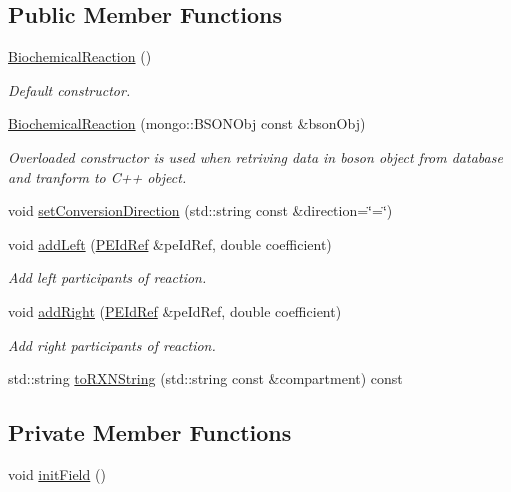 \subsection*{Public Member Functions}
\begin{DoxyCompactItemize}
\item 
\hyperlink{classunisys_1_1BiochemicalReaction_a1058034c07346ef992ba78c3260b1ac6}{Biochemical\-Reaction} ()
\begin{DoxyCompactList}\small\item\em Default constructor. \end{DoxyCompactList}\item 
\hyperlink{classunisys_1_1BiochemicalReaction_a50d32f8995cb279b41c37a731f48bfe1}{Biochemical\-Reaction} (mongo\-::\-B\-S\-O\-N\-Obj const \&bson\-Obj)
\begin{DoxyCompactList}\small\item\em Overloaded constructor is used when retriving data in boson object from database and tranform to C++ object. \end{DoxyCompactList}\item 
void \hyperlink{classunisys_1_1BiochemicalReaction_a33073d1e349bdcb5cf5c95fda55e2ede}{set\-Conversion\-Direction} (std\-::string const \&direction=\char`\"{}=\char`\"{})
\item 
void \hyperlink{classunisys_1_1BiochemicalReaction_a5f80d7411cbfa867c583d8137d9c4db5}{add\-Left} (\hyperlink{classunisys_1_1PEIdRef}{P\-E\-Id\-Ref} \&pe\-Id\-Ref, double coefficient)
\begin{DoxyCompactList}\small\item\em Add left participants of reaction. \end{DoxyCompactList}\item 
void \hyperlink{classunisys_1_1BiochemicalReaction_a62c77e5e197b9a89c7d2d3a9555ff14d}{add\-Right} (\hyperlink{classunisys_1_1PEIdRef}{P\-E\-Id\-Ref} \&pe\-Id\-Ref, double coefficient)
\begin{DoxyCompactList}\small\item\em Add right participants of reaction. \end{DoxyCompactList}\item 
std\-::string \hyperlink{classunisys_1_1BiochemicalReaction_ac0ae394fe6271ab66a88ec8fe36a68ae}{to\-R\-X\-N\-String} (std\-::string const \&compartment) const 
\end{DoxyCompactItemize}
\subsection*{Private Member Functions}
\begin{DoxyCompactItemize}
\item 
void \hyperlink{classunisys_1_1BiochemicalReaction_a61d5cb519be2ac672ae8e243abdc7489}{init\-Field} ()
\end{DoxyCompactItemize}
